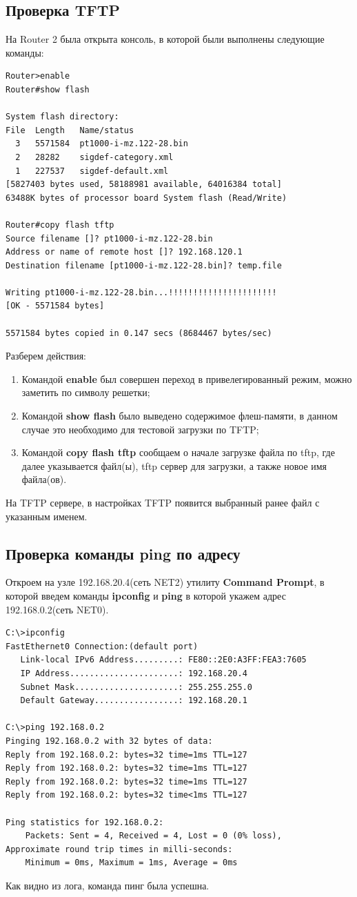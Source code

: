 \subsection{Проверка TFTP}
На Router 2 была открыта консоль, в которой были выполнены следующие команды:
\begin{lstlisting}[language={}]
Router>enable
Router#show flash

System flash directory:
File  Length   Name/status
  3   5571584  pt1000-i-mz.122-28.bin
  2   28282    sigdef-category.xml
  1   227537   sigdef-default.xml
[5827403 bytes used, 58188981 available, 64016384 total]
63488K bytes of processor board System flash (Read/Write)

Router#copy flash tftp
Source filename []? pt1000-i-mz.122-28.bin
Address or name of remote host []? 192.168.120.1
Destination filename [pt1000-i-mz.122-28.bin]? temp.file

Writing pt1000-i-mz.122-28.bin...!!!!!!!!!!!!!!!!!!!!!!
[OK - 5571584 bytes]

5571584 bytes copied in 0.147 secs (8684467 bytes/sec)
\end{lstlisting}
Разберем действия:
\begin{enumerate}
\item Командой \textbf{enable} был совершен переход в привелегированный режим, можно заметить по символу решетки;
\item Командой \textbf{show flash} было выведено содержимое флеш-памяти, в данном случае это необходимо для тестовой загрузки по TFTP;
\item Командой \textbf{copy flash tftp} сообщаем о начале загрузке файла по tftp, где далее указывается файл(ы), tftp сервер для загрузки, а также новое имя файла(ов). 
\end{enumerate}
На TFTP сервере, в настройках TFTP появится выбранный ранее файл с указанным именем.

\subsection{Проверка команды ping по адресу}
Откроем на узле 192.168.20.4(сеть NET2) утилиту \textbf{Command Prompt}, в которой введем команды \textbf{ipconfig} и \textbf{ping} в которой укажем адрес 192.168.0.2(сеть NET0).
\begin{lstlisting}[language={}]
C:\>ipconfig
FastEthernet0 Connection:(default port)
   Link-local IPv6 Address.........: FE80::2E0:A3FF:FEA3:7605
   IP Address......................: 192.168.20.4
   Subnet Mask.....................: 255.255.255.0
   Default Gateway.................: 192.168.20.1

C:\>ping 192.168.0.2
Pinging 192.168.0.2 with 32 bytes of data:
Reply from 192.168.0.2: bytes=32 time=1ms TTL=127
Reply from 192.168.0.2: bytes=32 time=1ms TTL=127
Reply from 192.168.0.2: bytes=32 time=1ms TTL=127
Reply from 192.168.0.2: bytes=32 time<1ms TTL=127

Ping statistics for 192.168.0.2:
    Packets: Sent = 4, Received = 4, Lost = 0 (0% loss),
Approximate round trip times in milli-seconds:
    Minimum = 0ms, Maximum = 1ms, Average = 0ms
\end{lstlisting}
Как видно из лога, команда пинг была успешна.

